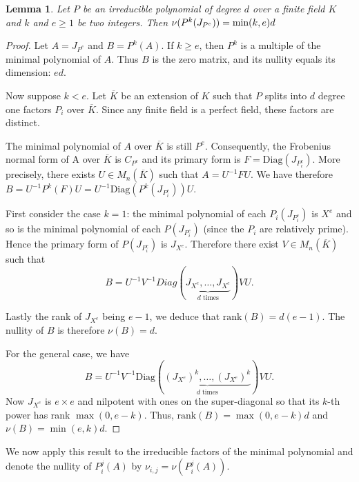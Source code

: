 \documentclass{article}
\newtheorem{lem}[thm]{Lemma}
\begin{document}
\begin{lem}
Let $P$ be an irreducible polynomial of degree $d$ over a finite field $K$
and $k$ and $e\geq 1$ be two integers. Then 
$\nu(P^k(J_{P^e})) = \text{min}(k,e)d \\ 
$
\end{lem}
\begin{proof}
Let $A=J_{P^e}$ and $B=P^k(A)$. 
If $k\geq e$, then $P^k$ is a multiple of the minimal polynomial of
$A$. Thus $B$ is the zero matrix, and its nullity equals its dimension: $ed$.



Now suppose $k<e$.
Let $\overline{K}$ be an extension of $K$ such that $P$ splits into
$d$ degree one factors $P_i$ over $\overline{K}$. Since any finite field is a perfect field, these factors are distinct.

The minimal polynomial of $A$ over $\overline{K}$ is still $P^e$. 
Consequently, the Frobenius normal form of A over
$\overline{K}$ is $C_{P^e}$ and  
its primary form is $F=\text{Diag}(J_{P_i^e})$. More precisely,
there exists $U \in M_n(\overline{K})$ such that
$A = U^{-1}FU$.
We have therefore $B=U^{-1}P^k(F)U = U^{-1}\text{Diag}(P^k(J_{P_i^e}))U.$

First consider the case $k=1$: the minimal polynomial of each
$P_i(J_{P_i^e})$ is $X^e$ and so is the minimal polynomial of each
$P(J_{P_i^e})$ (since the $P_i$ are relatively prime). Hence the primary form
of $P(J_{P_i^e})$ is $J_{X^e}$. Therefore there
exist $V\in M_n(\overline{K})$ such that 
$$
B=U^{-1}V^{-1}
Diag(\underbrace{J_{X^e},\dots,J_{X^e}}_{d \text{ times}}) V U.
$$

Lastly the rank of $J_{X^e}$ being $e-1$, we deduce that
$\text{rank}(B)= d(e-1)$. The nullity of $B$ is therefore $\nu(B)=d$.

For the general case, we have
$$
B =
U^{-1}V^{-1}\text{Diag}(\underbrace{(J_{X^e})^k,\dots,(J_{X^e})^k}_{d
\text{ times}})VU.
$$
Now $J_{X^e}$ is $e\times e$ and nilpotent with ones on the super-diagonal
so that its $k$-th power has rank $\max(0,e-k)$.
Thus, $\text{rank}(B)=\max(0,e-k)d$ and $\nu(B)=\min(e,k)d$.
\end{proof}
We now apply this result to the irreducible factors of the minimal polynomial
and denote the nullity of $P_i^j(A)$ by 
$\nu_{i,j}=\nu(P_i^j(A))$. 
\end{document}
